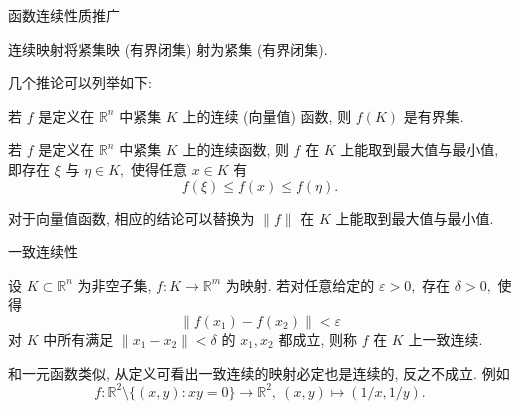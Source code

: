 
\begin{frame}{函数连续性质推广}

\begin{thm}
连续映射将紧集映 (有界闭集) 射为紧集 (有界闭集).
\end{thm}
几个推论可以列举如下:

\pause

\begin{thm}[有界性定理]
若 $f$ 是定义在 $\mathbb{R}^n$ 中紧集 $K$ 上的连续 (向量值) 函数, 则 $f(K)$ 是有界集.
\end{thm}

\pause

\begin{thm}[最值定理]
若 $f$ 是定义在 $\mathbb{R}^n$ 中紧集 $K$ 上的连续函数, 则 $f$ 在 $K$ 上能取到最大值与最小值, 即存在 $\xi$ 与 $\eta \in K,$ 使得任意 $x \in K$ 有
\[f(\xi) \leqslant f(x) \leqslant f(\eta).\]
\end{thm}
\pause
对于向量值函数, 相应的结论可以替换为 $\lVert f \rVert$ 在 $K$ 上能取到最大值与最小值.

\end{frame}


\begin{frame}{一致连续性}

\begin{Def}[一致连续映射]
设 $K \subset \mathbb{R}^n$ 为非空子集, $f: K \to \mathbb{R}^m$ 为映射. 若对任意给定的 $\varepsilon > 0,$ 存在 $\delta > 0,$ 使得
\[\lVert f(x_1) - f(x_2) \rVert < \varepsilon\]
对 $K$ 中所有满足 $\lVert x_1 - x_2 \rVert < \delta$ 的 $x_1, x_2$ 都成立, 则称 $f$ 在 $K$ 上一致连续.
\end{Def}

\pause
\vspace{1em}

和一元函数类似, 从定义可看出一致连续的映射必定也是连续的, 反之不成立. 例如
\[f: \mathbb{R}^2 \setminus \{(x, y): xy = 0\} \rightarrow \mathbb{R}^2, ~ (x,y) \mapsto (1 / x, 1 / y).\]

\end{frame}


